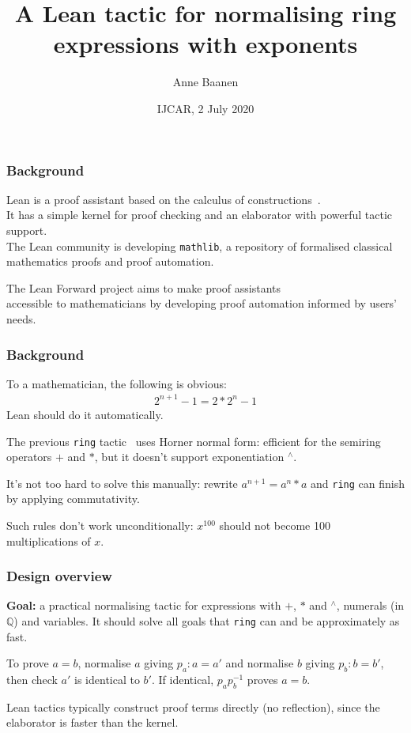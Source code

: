 \documentclass{beamer}
\title{A Lean tactic for normalising ring expressions with exponents}
\author{Anne Baanen}
\institute{\vspace{-\baselineskip}Lean Forward\\Vrije Universiteit Amsterdam}
\date{\vspace{-\baselineskip}IJCAR, 2 July 2020}
\newcommand{\Q}{\mathbb{Q}}
\newcommand{\lean}[1]{\texttt{#1}\xspace} %
\newcommand{\pow}{{\ensuremath{{}^\wedge}}\xspace}
\newcommand{\ring}{\lean{ring}}
\begin{document}
\frame{\titlepage}

\begin{frame} \frametitle{Background}
	Lean is a proof assistant based on the calculus of constructions~\cite{lean-prover}.\\
	It has a simple kernel for proof checking and an elaborator with powerful tactic support.\\
	The Lean community is developing \texttt{mathlib},
	a repository of formalised classical mathematics proofs and proof automation.

	The Lean Forward project aims to make proof assistants\\
	accessible to mathematicians by developing proof automation informed by users' needs.
\end{frame}

\begin{frame} \frametitle{Background}
	To a mathematician, the following is obvious:
	\begin{align*}
		2^{n+1} - 1 = 2 * 2^n - 1
	\end{align*}
	Lean should do it automatically.

	The previous \ring tactic~\cite{ring-tactic} uses Horner normal form: efficient for the semiring operators $+$ and $*$,
	but it doesn't support exponentiation $\pow$.

\pause
	It's not too hard to solve this manually:
	rewrite $a^{n + 1} = a^n * a$ and \ring can finish by applying commutativity.

	Such rules don't work unconditionally: $x^{100}$ should not become 100 multiplications of $x$.
\end{frame}

\begin{frame} \frametitle{Design overview}
	\textbf{Goal:} a practical normalising tactic for expressions with $+$, $*$ and \pow, numerals (in $\Q$) and variables.
	It should solve all goals that \ring can and be approximately as fast.

\pause
	To prove $a = b$, normalise $a$ giving $p_a : a = a'$ and normalise $b$ giving $p_b : b = b'$, then check $a'$ is identical to $b'$.
	If identical, $p_a p_b^{-1}$ proves $a = b$.

	Lean tactics typically construct proof terms directly (no reflection), since the elaborator is faster than the kernel.
\end{frame}
\end{document}
